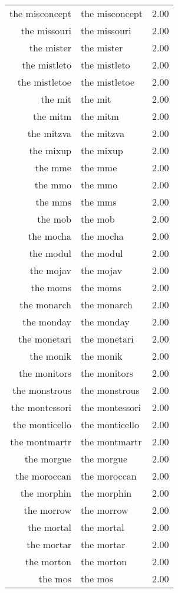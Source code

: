 \begin{table}[ht]
\begin{tabular}{rlr}
  the misconcept & the misconcept & 2.00 \\ 
  the missouri & the missouri & 2.00 \\ 
  the mister & the mister & 2.00 \\ 
  the mistleto & the mistleto & 2.00 \\ 
  the mistletoe & the mistletoe & 2.00 \\ 
  the mit & the mit & 2.00 \\ 
  the mitm & the mitm & 2.00 \\ 
  the mitzva & the mitzva & 2.00 \\ 
  the mixup & the mixup & 2.00 \\ 
  the mme & the mme & 2.00 \\ 
  the mmo & the mmo & 2.00 \\ 
  the mms & the mms & 2.00 \\ 
  the mob & the mob & 2.00 \\ 
  the mocha & the mocha & 2.00 \\ 
  the modul & the modul & 2.00 \\ 
  the mojav & the mojav & 2.00 \\ 
  the moms & the moms & 2.00 \\ 
  the monarch & the monarch & 2.00 \\ 
  the monday & the monday & 2.00 \\ 
  the monetari & the monetari & 2.00 \\ 
  the monik & the monik & 2.00 \\ 
  the monitors & the monitors & 2.00 \\ 
  the monstrous & the monstrous & 2.00 \\ 
  the montessori & the montessori & 2.00 \\ 
  the monticello & the monticello & 2.00 \\ 
  the montmartr & the montmartr & 2.00 \\ 
  the morgue & the morgue & 2.00 \\ 
  the moroccan & the moroccan & 2.00 \\ 
  the morphin & the morphin & 2.00 \\ 
  the morrow & the morrow & 2.00 \\ 
  the mortal & the mortal & 2.00 \\ 
  the mortar & the mortar & 2.00 \\ 
  the morton & the morton & 2.00 \\ 
  the mos & the mos & 2.00 \\ 

\end{tabular}
\end{table}
